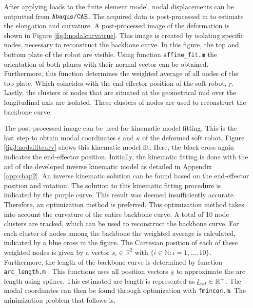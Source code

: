 After applying loads to the finite element model, nodal displacements can be outputted from $\verb+Abaqus/CAE+$. The acquired data is post-processed in \MATLAB to estimate the elongation and curvature. A post-processed image of the deformation is shown in Figure \ref{fig3:nodalcurvatrue}. This image is created by isolating specific nodes, necessary to reconstruct the backbone curve. In this figure, the top and bottom plate of the robot are visible. Using \MATLAB function \verb+affine_fit.m+ \cite{affinefit} the orientation of both planes with their normal vector can be obtained. Furthermore, this function determines the weighted average of all nodes of the top plate. Which coincides with the end-effector position of the soft robot, $\underbar{r}$. Lastly, the clusters of nodes that are situated at the geometrical mid over the longitudinal axis are isolated. These clusters of nodes are used to reconstruct the backbone curve. 


The post-processed image can be used for kinematic model fitting. This is the last step to obtain modal coordinates $\epsilon$ and $\kappa$ of the deformed soft robot. Figure \ref{fig3:nodalfitcurv} shows this kinematic model fit. Here, the black cross again indicates the end-effector position. Initially, the kinematic fitting is done with the aid of the developed inverse kinematic model as detailed in Appendix \ref{app:chap2}. An inverse kinematic solution can be found based on the end-effector position and rotation. The solution to this kinematic fitting procedure is indicated by the purple curve. This result was deemed insufficiently accurate. Therefore, an optimization method is preferred. This optimization method takes into account the curvature of the entire backbone curve. A total of 10 node clusters are tracked, which can be used to reconstruct the backbone curve. For each cluster of nodes among the backbone the weighted average is calculated, indicated by a blue cross in the figure. The Cartesian position of each of these weighted nodes is given by a vector $s_i \in \mathbb{R}^2$ with $\{i \in \mathbb{N}: i = {1,\dots,10}\}$. Furthermore, the length of the backbone curve is determined by \MATLAB function \verb+arc_length.m+ \cite{arclength}. This functions uses all position vectors $\underbar{$s$}$ to approximate the arc length using splines. This estimated arc length is represented as $\underbar{$l$}_{est} \in \mathbb{R}^+$. The modal coordinates can then be found through optimization with \verb+fmincon.m+. The minimization problem that follows is,



